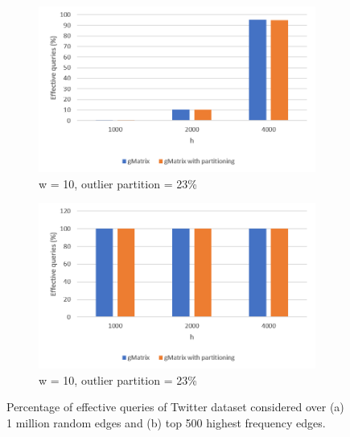 \begin{figure}[!htbp]
\centering
\begin{subfigure}{.5\textwidth}
  \centering
  \includegraphics[width=1\linewidth]{T3}
  \caption{w = 10, outlier partition = 23\%}
  \label{fig:sub1}
\end{subfigure}%
\begin{subfigure}{.5\textwidth}
  \centering
  \includegraphics[width=1\linewidth]{T3T}
  \caption{w = 10, outlier partition = 23\%}
  \label{fig:sub2}
\end{subfigure}
\caption{Percentage of effective queries of Twitter dataset considered over (a) 1 million random edges and (b) top 500 highest frequency edges.}
\label{fig:t3}
\end{figure}

